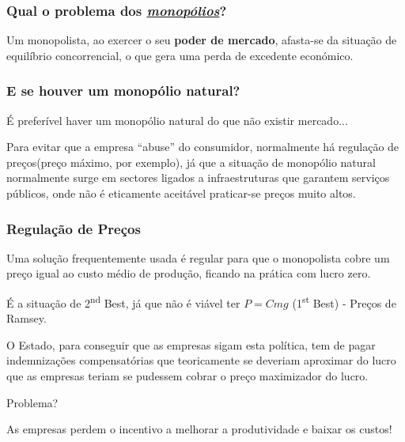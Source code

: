 \begin{frame}
	\frametitle{Qual o problema dos \emph{\underline{monop\'olios}}?}
	Um monopolista, ao exercer o seu \textbf{poder de mercado}, afasta-se da situa\c c\~ao de equil\'ibrio concorrencial, o que gera uma perda de excedente econ\'omico.
\end{frame}

\begin{frame}
	\frametitle{E se houver um monop\'olio natural?}
	\'E prefer\'ivel haver um monop\'olio natural do que n\~ao existir mercado...\par\pause
	\vspace{0.4cm}
	Para evitar que a empresa ``abuse'' do consumidor, normalmente h\'a regula\c c\~ao de pre\c cos(pre\c co m\'aximo, por exemplo), j\'a que a situa\c c\~ao de monop\'olio natural normalmente surge em sectores ligados a infraestruturas que garantem servi\c cos p\'ublicos, onde n\~ao \'e eticamente aceit\'avel praticar-se pre\c cos muito altos.
\end{frame}

\begin{frame}
	\frametitle{Regula\c c\~ao de Pre\c cos}
	Uma solu\c c\~ao frequentemente usada \'e regular para que o monopolista cobre um pre\c co igual ao custo m\'edio de produ\c c\~ao, ficando na pr\' atica com lucro zero.\par
	
	\vspace{0.3cm}

	\'E a situa\c c\~ao de 2\textsuperscript{nd} Best, j\'a que n\~ao \'e vi\'avel ter $P=Cmg$ (1\textsuperscript{st} Best) - Pre\c cos de Ramsey.\par
	
	\vspace{0.3cm}

	O Estado, para conseguir que as empresas sigam esta pol\'itica, tem de pagar indemniza\c c\~oes compensat\'orias que teoricamente se deveriam aproximar do lucro que as empresas teriam se pudessem cobrar o pre\c co maximizador do lucro.
\end{frame}

\begin{frame}
	Problema?\pause\par
	\vspace{0.5cm}

	{\centering \Large As empresas perdem o incentivo a melhorar a produtividade e baixar os custos!
	}
\end{frame}

